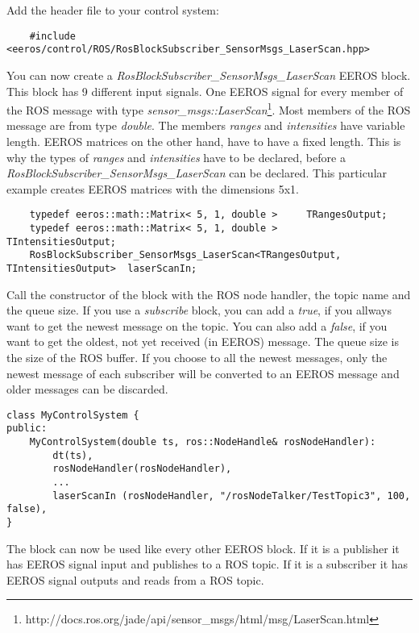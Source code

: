 Add the header file to your control system:
\lstset{language=c}
\begin{lstlisting}
	#include <eeros/control/ROS/RosBlockSubscriber_SensorMsgs_LaserScan.hpp>
\end{lstlisting}

You can now create a \textit{RosBlockSubscriber\_SensorMsgs\_LaserScan} EEROS block.
This block has 9 different input signals.
One EEROS signal for every member of the ROS message with type \textit{sensor\_msgs::LaserScan}\footnote{http://docs.ros.org/jade/api/sensor\_msgs/html/msg/LaserScan.html}. 
Most members of the ROS message are from type \textit{double}.
The members \textit{ranges} and \textit{intensities} have variable length.
EEROS matrices on the other hand, have to have a fixed length.
This is why the types of \textit{ranges} and \textit{intensities} have to be declared, before a \textit{RosBlockSubscriber\_SensorMsgs\_LaserScan} can be declared.
This particular example creates EEROS matrices with the dimensions 5x1.
\lstset{language=c}
\begin{lstlisting}
	typedef eeros::math::Matrix< 5, 1, double >		TRangesOutput;
	typedef eeros::math::Matrix< 5, 1, double >		TIntensitiesOutput;
	RosBlockSubscriber_SensorMsgs_LaserScan<TRangesOutput, TIntensitiesOutput>	laserScanIn;
\end{lstlisting}

Call the constructor of the block with the ROS node handler, the topic name and the queue size.
If you use a \textit{subscribe} block, you can add a \textit{true}, if you allways want to get the newest message on the topic.
You can also add a \textit{false}, if you want to get the oldest, not yet received (in EEROS) message.
The queue size is the size of the ROS buffer.
If you choose to all the newest messages, only the newest message of each subscriber will be converted to an EEROS message and older messages can be discarded.
\lstset{language=c}
\begin{lstlisting}
class MyControlSystem {
public:
	MyControlSystem(double ts, ros::NodeHandle& rosNodeHandler):
		dt(ts),
		rosNodeHandler(rosNodeHandler),
		...
		laserScanIn (rosNodeHandler, "/rosNodeTalker/TestTopic3", 100, false),
}
\end{lstlisting}

The block can now be used like every other EEROS block.
If it is a publisher it has EEROS signal input and publishes to a ROS topic.
If it is a subscriber it has EEROS signal outputs and reads from a ROS topic.


